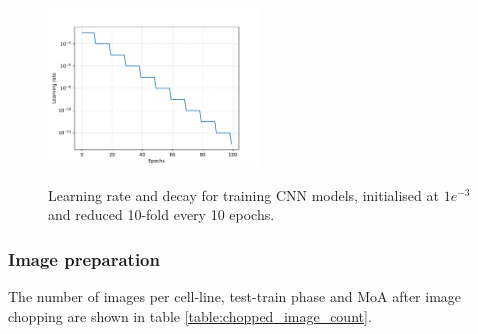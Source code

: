 \documentclass[a4paper,11pt,twoside,openright]{scrbook}
\begin{document}
\begin{figure}
    \captionsetup{width=0.8\textwidth}
    \caption[CNN learning rate and decay]{
Learning rate and decay for training CNN models, initialised at $1e^{-3}$ and reduced 10-fold every 10 epochs.
}
    \includegraphics[width=0.5\textwidth]{ch2learningRate}
    \label{figure:learningRate}
\end{figure}


\subsubsection{Image preparation}

The number of images per cell-line, test-train phase and MoA after image chopping are shown in table \ref{table:chopped_image_count}.
\end{document}
